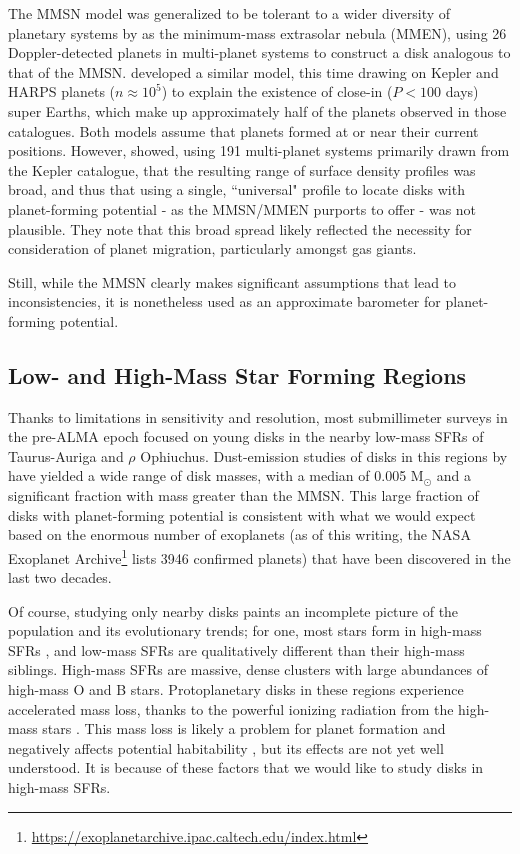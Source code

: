 The MMSN model was generalized to be tolerant to a wider diversity of planetary systems by \citet{Kuchner2004} as the minimum-mass extrasolar nebula (MMEN), using 26 Doppler-detected planets in multi-planet systems to construct a disk analogous to that of the MMSN. \citet{ChiangLaughlin2013} developed a similar model, this time drawing on Kepler and HARPS planets ($n \approx 10^5$) to explain the existence of close-in ($P < 100$ days) super Earths, which make up approximately half of the planets observed in those catalogues. Both models assume that planets formed at or near their current positions. However, \citet{Raymond2014} showed, using 191 multi-planet systems primarily drawn from the Kepler catalogue, that the resulting range of surface density profiles was broad, and thus that using a single, ``universal" profile to locate disks with planet-forming potential - as the MMSN/MMEN purports to offer - was not plausible. They note that this broad spread likely reflected the necessity for consideration of planet migration, particularly amongst gas giants.

Still, while the MMSN clearly makes significant assumptions that lead to inconsistencies, it is nonetheless used as an approximate barometer for planet-forming potential.




\subsection{Low- and High-Mass Star Forming Regions}
Thanks to limitations in sensitivity and resolution, most submillimeter surveys in the pre-ALMA epoch focused on young disks in the nearby low-mass SFRs of Taurus-Auriga and $\rho$ Ophiuchus. Dust-emission studies of disks in this regions by \citet{AndrewsWilliams2005,AndrewsWilliams2007} have yielded a wide range of disk masses, with a median of 0.005 M$_{\odot}$ and a significant fraction with mass greater than the MMSN. This large fraction of disks with planet-forming potential is consistent with what we would expect based on the enormous number of exoplanets (as of this writing, the NASA Exoplanet Archive\footnote{\url{https://exoplanetarchive.ipac.caltech.edu/index.html}} lists 3946 confirmed planets)  that have been discovered in the last two decades.


Of course, studying only nearby disks paints an incomplete picture of the population and its evolutionary trends; for one, most stars form in high-mass SFRs \citep{LadaLada2003,Mann2015}, and low-mass SFRs are qualitatively different than their high-mass siblings. High-mass SFRs are massive, dense clusters with large abundances of high-mass O and B stars. Protoplanetary disks in these regions experience accelerated mass loss, thanks to the powerful ionizing radiation from the high-mass stars \citep{Anderson2013,Kalyaan2015,Xiao2018}. This mass loss is likely a problem for planet formation \citep{Johnstone1998,Ovelar2012} and negatively affects potential habitability \citep{Kruijssen2019}, but its effects are not yet well understood. It is because of these factors that we would like to study disks in high-mass SFRs.


